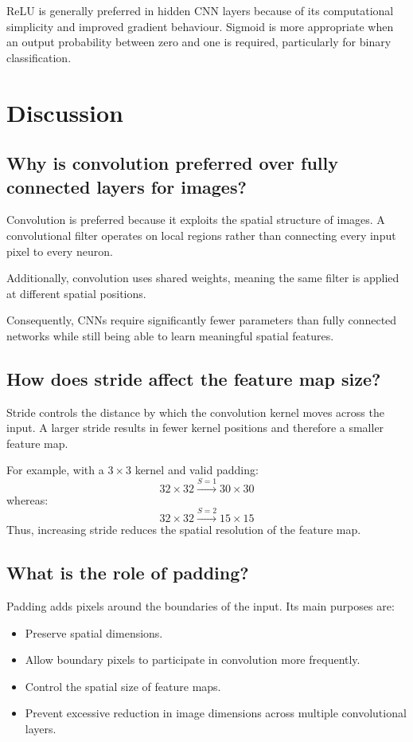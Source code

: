 \documentclass[11pt]{article}
\begin{document}
ReLU is generally preferred in hidden CNN layers because of its computational simplicity and improved gradient behaviour. Sigmoid is more appropriate when an output probability between zero and one is required, particularly for binary classification.

\section{Discussion}

\subsection{Why is convolution preferred over fully connected layers for images?}
Convolution is preferred because it exploits the spatial structure of images. A convolutional filter operates on local regions rather than connecting every input pixel to every neuron.

Additionally, convolution uses shared weights, meaning the same filter is applied at different spatial positions.

Consequently, CNNs require significantly fewer parameters than fully connected networks while still being able to learn meaningful spatial features.

\subsection{How does stride affect the feature map size?}
Stride controls the distance by which the convolution kernel moves across the input. A larger stride results in fewer kernel positions and therefore a smaller feature map.

For example, with a $3 \times 3$ kernel and valid padding:
\[
32 \times 32 \xrightarrow{S=1} 30 \times 30
\]
whereas:
\[
32 \times 32 \xrightarrow{S=2} 15 \times 15
\]
Thus, increasing stride reduces the spatial resolution of the feature map.

\subsection{What is the role of padding?}
Padding adds pixels around the boundaries of the input. Its main purposes are:
\begin{itemize}
    \item Preserve spatial dimensions.
    \item Allow boundary pixels to participate in convolution more frequently.
    \item Control the spatial size of feature maps.
    \item Prevent excessive reduction in image dimensions across multiple convolutional layers.
\end{itemize}
\end{document}
